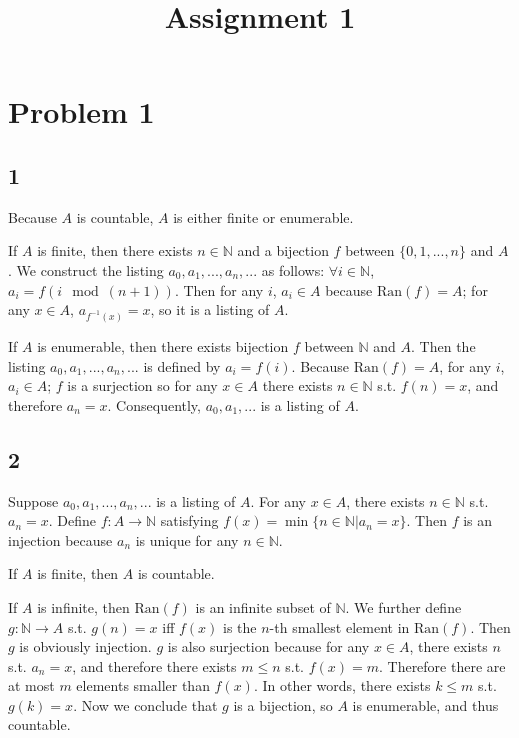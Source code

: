 \documentclass{article}
\title{\huge{\textbf{Assignment 1}}}
\author{\Chi{杨乐天}}
\date{}
\newcommand \ran[1]							{\text{Ran}\left( #1 \right)}
\begin{document}
\maketitle

\section*{Problem 1}

\subsection*{1}

Because $A$ is countable, $A$ is either finite or enumerable.

If $A$ is finite, then there exists $n \in \mathbb{N}$ and a bijection $f$ between $\{0,1,...,n\}$ and $A$. We construct the listing $a_0, a_1, ..., a_n, ...$ as follows: $\forall i \in \mathbb{N}$, $a_i=f(i\mod (n+1))$. Then for any $i$, $a_i \in A$ because $\ran{f}=A$; for any $x \in A$, $a_{f^{-1}(x)} = x$, so it is a listing of $A$.

If $A$ is enumerable, then there exists bijection $f$ between $\mathbb{N}$ and $A$. Then the listing $a_0, a_1, ..., a_n, ...$ is defined by $a_i = f(i)$. Because $\ran{f}=A$, for any $i$, $a_i \in A$; $f$ is a surjection so for any $x \in A$ there exists $n \in \mathbb{N}$ s.t. $f(n)=x$, and therefore $a_n=x$. Consequently, $a_0, a_1, ...$ is a listing of $A$.

\subsection*{2}

Suppose $a_0, a_1, ..., a_n, ...$ is a listing of $A$. For any $x \in A$, there exists $n \in \mathbb{N}$ s.t. $a_n=x$. Define $f:A \to \mathbb{N}$ satisfying $f(x) = \min\{ n\in\mathbb{N} | a_n=x\}$. Then $f$ is an injection because $a_n$ is unique for any $n\in \mathbb{N}$.

If $A$ is finite, then $A$ is countable.

If $A$ is infinite, then $\ran{f}$ is an infinite subset of $\mathbb{N}$. We further define $g: \mathbb{N} \to A$ s.t. $g(n)=x$ iff $f(x)$ is the $n$-th smallest element in $\ran{f}$. Then $g$ is obviously injection. $g$ is also surjection because for any $x \in A$, there exists $n$ s.t. $a_n=x$, and therefore there exists $m \le n$ s.t. $f(x)=m$. Therefore there are at most $m$ elements smaller than $f(x)$. In other words, there exists $k \le m$ s.t. $g(k)=x$. Now we conclude that $g$ is a bijection, so $A$ is enumerable, and thus countable.
\end{document}
